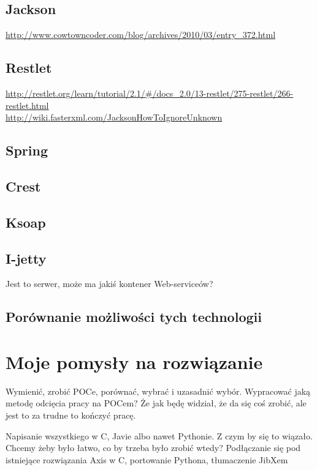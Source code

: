 \documentclass[twoside,a4paper]{book}
\begin{document}
\subsection{Jackson}
\url{http://www.cowtowncoder.com/blog/archives/2010/03/entry_372.html}\\

\subsection{Restlet}
\url{http://restlet.org/learn/tutorial/2.1/#/docs_2.0/13-restlet/275-restlet/266-restlet.html}\\
\url{http://wiki.fasterxml.com/JacksonHowToIgnoreUnknown}\\

\subsection{Spring}
\subsection{Crest}
\subsection{Ksoap}

\subsection{I-jetty}
Jest to serwer, może ma jakiś kontener Web-serviceów?

\subsection{Porównanie możliwości tych technologii}


\section{Moje pomysły na rozwiązanie}
Wymienić, zrobić POCe, porównać, wybrać i uzasadnić wybór. Wypracować jaką metodę odcięcia pracy na POCem? Że jak będę widział, że da się coś zrobić, ale jest to za trudne to kończyć pracę.

Napisanie wszystkiego w C, Javie albo nawet Pythonie. Z czym by się to wiązało. Chcemy żeby było łatwo, co by trzeba było zrobić wtedy?
Podłączanie się pod istniejące rozwiązania Axis w C, portowanie Pythona, tłumaczenie JibXem
\end{document}
